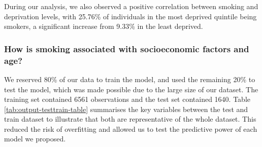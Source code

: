 \documentclass[
  11pt,
  twocolumn]{article}
\begin{document}
During our analysis, we also observed a positive correlation between
smoking and deprivation levels, with 25.76\% of individuals in the most
deprived quintile being smokers, a significant increase from 9.33\% in
the least deprived.

\hypertarget{how-is-smoking-associated-with-socioeconomic-factors-and-age}{%
\subsubsection{How is smoking associated with socioeconomic factors and
age?}\label{how-is-smoking-associated-with-socioeconomic-factors-and-age}}

We reserved 80\% of our data to train the model, and used the remaining
20\% to test the model, which was made possible due to the large size of
our dataset. The training set contained 6561 observations and the test
set contained 1640. Table \ref{tab:output-testtrain-table} summarises
the key variables between the test and train dataset to illustrate that
both are representative of the whole dataset. This reduced the risk of
overfitting and allowed us to test the predictive power of each model we
proposed.
\end{document}

